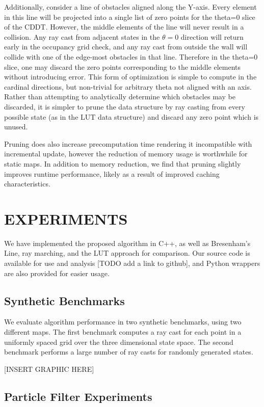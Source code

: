 \documentclass[letterpaper, 10 pt, conference]{ieeeconf}  %
\begin{document}
Additionally, consider a line of obstacles aligned along the Y-axis. Every element in this line will be projected into a single list of zero points for the theta=0 slice of the CDDT. However, the middle elements of the line will never result in a collision. Any ray cast from adjacent states in the $\theta=0$ direction will return early in the occupancy grid check, and any ray cast from outside the wall will collide with one of the edge-most obstacles in that line. Therefore in the theta=0 slice, one may discard the zero points corresponding to the middle elements without introducing error. This form of optimization is simple to compute in the cardinal directions, but non-trivial for arbitrary theta not aligned with an axis. Rather than attempting to analytically determine which obstacles may be discarded, it is simpler to prune the data structure by ray casting from every possible state (as in the LUT data structure) and discard any zero point which is unused. 

Pruning does also increase precomputation time rendering it incompatible with incremental update, however the reduction of memory usage is worthwhile for static maps. In addition to memory reduction, we find that pruning slightly improves runtime performance, likely as a result of improved caching characteristics.

\section{EXPERIMENTS}

We have implemented the proposed algorithm in C++, as well as Bresenham’s Line, ray marching, and the LUT approach for comparison. Our source code is available for use and analysis [TODO add a link to github], and Python wrappers are also provided for easier usage.


\subsection{Synthetic Benchmarks}

We evaluate algorithm performance in two synthetic benchmarks, using two different maps. The first benchmark computes a ray cast for each point in a uniformly spaced grid over the three dimensional state space. The second benchmark performs a large number of ray casts for randomly generated states.

[INSERT GRAPHIC HERE]

\subsection{Particle Filter Experiments}
\end{document}
